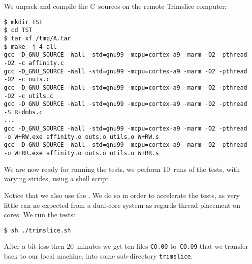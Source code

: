 We unpack and compile the C~sources on the remote Trimslice computer:
\begin{verbatim}
$ mkdir TST
$ cd TST
$ tar xf /tmp/A.tar
$ make -j 4 all
gcc -D_GNU_SOURCE -Wall -std=gnu99 -mcpu=cortex-a9 -marm -O2 -pthread -O2 -c affinity.c
gcc -D_GNU_SOURCE -Wall -std=gnu99 -mcpu=cortex-a9 -marm -O2 -pthread -O2 -c outs.c
gcc -D_GNU_SOURCE -Wall -std=gnu99 -mcpu=cortex-a9 -marm -O2 -pthread -O2 -c utils.c
gcc -D_GNU_SOURCE -Wall -std=gnu99 -mcpu=cortex-a9 -marm -O2 -pthread -S R+dmbs.c
...
gcc -D_GNU_SOURCE -Wall -std=gnu99 -mcpu=cortex-a9 -marm -O2 -pthread  -o W+RW.exe affinity.o outs.o utils.o W+RW.s
gcc -D_GNU_SOURCE -Wall -std=gnu99 -mcpu=cortex-a9 -marm -O2 -pthread  -o W+RR.exe affinity.o outs.o utils.o W+RR.s
\end{verbatim}
We are now ready for running the tests, we perform $10$~runs of the tests,
with varying strides, using a shell script .

Notice that we also use the
.
We do so in order to accelerate the tests, as very little
can ne expected from a dual-core system as regards thread placement on cores.
We run the tests:
\begin{verbatim}
$ sh ./trimslice.sh
\end{verbatim}
After a bit less then $20$~minutes we get ten files
\texttt{CO.00} to~\texttt{CO.09} that we transfer back to our local machine,
into some sub-directory \texttt{trimslice}.

